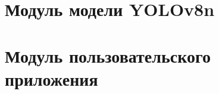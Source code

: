 \begin{appendices}
    \chapter{Модуль модели YOLOv8n}



    \chapter{Модуль пользовательского приложения}

\end{appendices}
